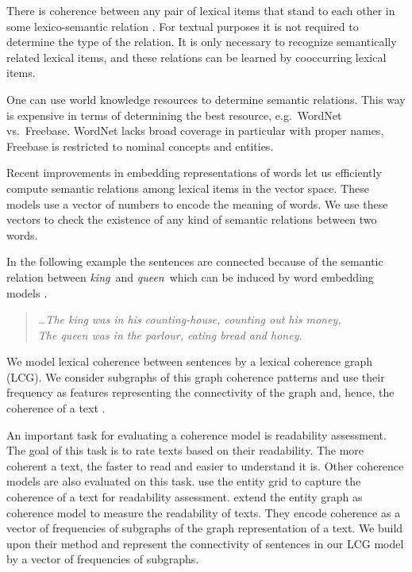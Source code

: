 There is coherence between any pair of lexical items that stand to
each other in some lexico-semantic relation
\cite{halliday76}. For textual purposes it is not required to
determine the type of the relation. It is only necessary to recognize
semantically related lexical items, and these relations can be learned
by cooccurring lexical items.

One can use world knowledge resources to determine semantic relations. This way is expensive in terms of determining the best resource, e.g.\ WordNet vs.\ Freebase. WordNet lacks broad coverage in particular with proper names, Freebase is restricted to nominal
concepts and entities. 

Recent improvements in embedding representations of words let us
efficiently compute semantic relations among lexical items in the vector space. 
These models use a vector of numbers to encode the meaning of words. We use these vectors to check the existence of any kind of semantic relations between two words. 

In the following example the sentences are connected because of the
semantic relation between \emph{king}\ and \emph{queen}\ which can be
induced by word embedding models \cite{mikolov13c,pennington14}.

\begin{quote}
  \emph{\ldots The king was in his counting-house, counting out his money,\\ 
    The queen was in the parlour, eating bread and honey.} 
\end{quote}

We model lexical coherence between sentences by a lexical coherence
graph (LCG). We consider subgraphs of this graph coherence patterns
and use their frequency as features representing the connectivity of
the graph and, hence, the coherence of a text \cite{mesgar15}.

An important task for evaluating a coherence model is readability
assessment. The goal of this task is to rate texts based on their
readability. The more coherent a text, the faster to read and easier
to understand it is. Other coherence models
\cite{barzilay08,guinaudeau13,mesgar14} are also evaluated on this
task.
 use the entity grid \cite{barzilay08} to capture the coherence of a text for readability assessment.  extend the entity
graph \cite{guinaudeau13} as coherence model to measure the
readability of texts. They encode coherence as a vector of
frequencies of subgraphs of the graph representation of a text. We
build upon their method and represent the connectivity of
sentences in our LCG model by a vector of frequencies of subgraphs.

